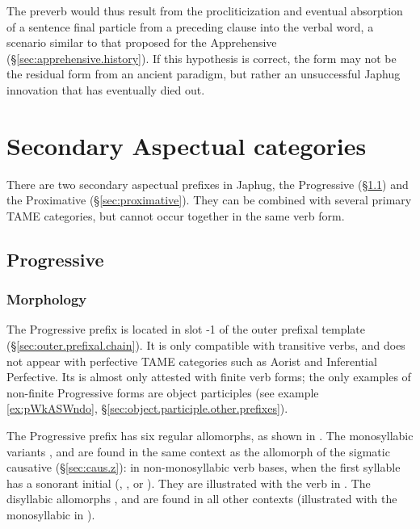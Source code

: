 The preverb  would thus result from the procliticization and eventual absorption of a sentence final particle from a preceding clause into the verbal word, a scenario similar to that proposed for the Apprehensive  (§\ref{sec:apprehensive.history}). If this hypothesis is correct, the form  may not be the residual form from an ancient paradigm, but rather an unsuccessful Japhug innovation that has eventually died out.

  \section{Secondary Aspectual categories} \label{sec:second.aspect}
There are two secondary aspectual prefixes in Japhug, the Progressive (§\ref{sec:progressive}) and the Proximative (§\ref{sec:proximative}). They can be combined with several primary TAME categories, but cannot occur together in the same verb form. 

\subsection{Progressive} \label{sec:progressive}
\subsubsection{Morphology} \label{sec:progressive.morphology}
  
The Progressive prefix  is located in slot -1 of the outer prefixal template (§\ref{sec:outer.prefixal.chain}). It is only compatible with transitive verbs, and does not appear with perfective TAME categories such as Aorist and Inferential Perfective. Its is almost only attested with finite verb forms; the only examples of non-finite Progressive forms are object participles (see example \ref{ex:pWkASWndo}, §\ref{sec:object.participle.other.prefixes}).

The Progressive prefix has six regular allomorphs, as shown in . The monosyllabic variants ,  and  are found in the same context as the  allomorph of the sigmatic causative (§\ref{sec:caus.z}): in non-monosyllabic verb bases, when the first syllable has a sonorant initial (, ,  or ). They are illustrated with the verb  in . The disyllabic allomorphs ,  and  are found in all other contexts (illustrated with the monosyllabic  in ).


